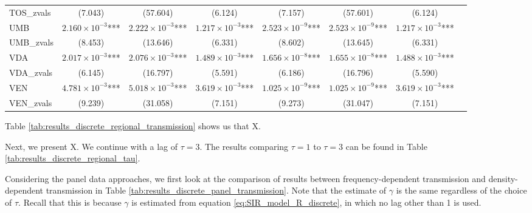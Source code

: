 \documentclass[12pt]{article}
\begin{document}
\begin{landscape}
\begin{longtable}{@{}lccccccc@{}}
        TOS\_zvals & (7.043) & (57.604) & (6.124) & (7.157) & (57.601) & (6.124) \\ 
        UMB & $2.160 \times 10^{-3}$*** & $2.222 \times 10^{-3}$*** & $1.217 \times 10^{-3}$*** & $2.523 \times 10^{-9}$*** & $2.523 \times 10^{-9}$*** & $1.217 \times 10^{-3}$*** \\ 
        UMB\_zvals & (8.453) & (13.646) & (6.331) & (8.602) & (13.645) & (6.331) \\ 
        VDA & $2.017 \times 10^{-3}$*** & $2.076 \times 10^{-3}$*** & $1.489 \times 10^{-3}$*** & $1.656 \times 10^{-8}$*** & $1.655 \times 10^{-8}$*** & $1.488 \times 10^{-3}$*** \\ 
        VDA\_zvals & (6.145) & (16.797) & (5.591) & (6.186) & (16.796) & (5.590) \\ 
        VEN & $4.781 \times 10^{-3}$*** & $5.018 \times 10^{-3}$*** & $3.619 \times 10^{-3}$*** & $1.025 \times 10^{-9}$*** & $1.025 \times 10^{-9}$*** & $3.619 \times 10^{-3}$*** \\ 
        VEN\_zvals & (9.239) & (31.058) & (7.151) & (9.273) & (31.047) & (7.151) \\* \bottomrule
	\end{longtable}
	\end{landscape}
	
	Table \ref{tab:results_discrete_regional_transmission} shows us that X.
	
	Next, we present X. We continue with a lag of $\tau = 3$. The results comparing $\tau = 1$ to $\tau = 3$ can be found in Table \ref{tab:results_discrete_regional_tau}.
	
	
	Considering the panel data approaches, we first look at the comparison of results between frequency-dependent transmission and density-dependent transmission in Table \ref{tab:results_discrete_panel_transmission}. Note that the estimate of $\gamma$ is the same regardless of the choice of $\tau$. Recall that this is because $\gamma$ is estimated from equation \eqref{eq:SIR_model_R_discrete}, in which no lag other than 1 is used. \\
	
\end{document}
